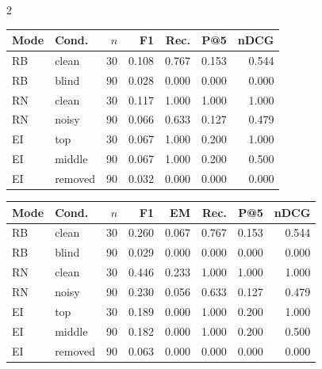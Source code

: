 \documentclass[11pt,a4paper]{article}
\begin{document}
\begin{multicols}{2}
\begin{center}
\scriptsize
\setlength{\tabcolsep}{2.5pt}
\begin{tabular}{@{}llrrrrr@{}}
\toprule
Mode & Cond. & $n$ & F1 & Rec. & P@5 & nDCG \\
\midrule
RB & clean & 30 & 0.108 & 0.767 & 0.153 & 0.544 \\
RB & blind & 90 & 0.028 & 0.000 & 0.000 & 0.000 \\
RN & clean & 30 & 0.117 & 1.000 & 1.000 & 1.000 \\
RN & noisy & 90 & 0.066 & 0.633 & 0.127 & 0.479 \\
EI & top & 30 & 0.067 & 1.000 & 0.200 & 1.000 \\
EI & middle & 90 & 0.067 & 1.000 & 0.200 & 0.500 \\
EI & removed & 90 & 0.032 & 0.000 & 0.000 & 0.000 \\
\bottomrule
\end{tabular}
\label{tab:claude-results}
\end{center}

\begin{center}
\scriptsize
\setlength{\tabcolsep}{2.5pt}
\begin{tabular}{@{}llrrrrrr@{}}
\toprule
Mode & Cond. & $n$ & F1 & EM & Rec. & P@5 & nDCG \\
\midrule
RB & clean & 30 & 0.260 & 0.067 & 0.767 & 0.153 & 0.544 \\
RB & blind & 90 & 0.029 & 0.000 & 0.000 & 0.000 & 0.000 \\
RN & clean & 30 & 0.446 & 0.233 & 1.000 & 1.000 & 1.000 \\
RN & noisy & 90 & 0.230 & 0.056 & 0.633 & 0.127 & 0.479 \\
EI & top & 30 & 0.189 & 0.000 & 1.000 & 0.200 & 1.000 \\
EI & middle & 90 & 0.182 & 0.000 & 1.000 & 0.200 & 0.500 \\
EI & removed & 90 & 0.063 & 0.000 & 0.000 & 0.000 & 0.000 \\
\bottomrule
\end{tabular}
\label{tab:llama-results}
\end{center}


\end{multicols}
\end{document}
